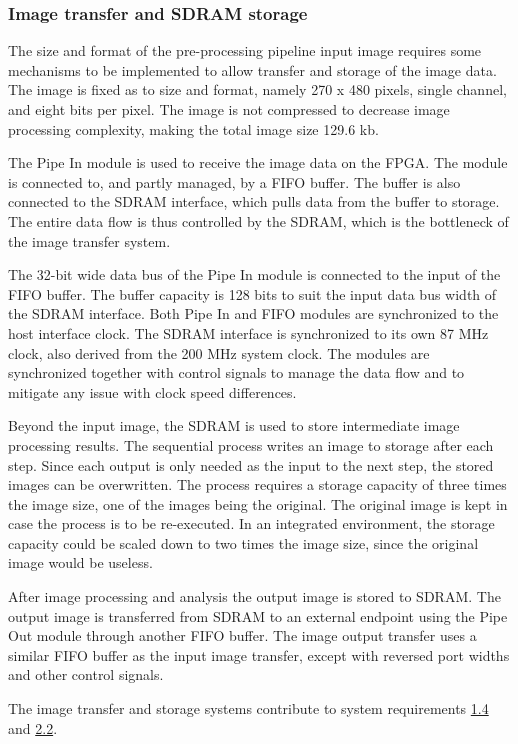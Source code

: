 \documentclass[12pt]{report}
\begin{document}
\subsubsection{Image transfer and SDRAM storage}
The size and format of the pre-processing pipeline input image requires some mechanisms to be implemented to allow transfer and storage of the image data. The image is fixed as to size and format, namely 270 x 480 pixels, single channel, and eight bits per pixel. The image is not compressed to decrease image processing complexity, making the total image size 129.6 kb.
\par
The Pipe In module is used to receive the image data on the FPGA. The module is connected to, and partly managed, by a FIFO buffer. The buffer is also connected to the SDRAM interface, which pulls data from the buffer to storage. The entire data flow is thus controlled by the SDRAM, which is the bottleneck of the image transfer system.
\par
The 32-bit wide data bus of the Pipe In module is connected to the input of the FIFO buffer. The buffer capacity is 128 bits to suit the input data bus width of the SDRAM interface. Both Pipe In and FIFO modules are synchronized to the host interface clock. The SDRAM interface is synchronized to its own 87 MHz clock, also derived from the 200 MHz system clock. The modules are synchronized together with control signals to manage the data flow and to mitigate any issue with clock speed differences.
\par
Beyond the input image, the SDRAM is used to store intermediate image processing results. The sequential process writes an image to storage after each step. Since each output is only needed as the input to the next step, the stored images can be overwritten. The process requires a storage capacity of three times the image size, one of the images being the original. The original image is kept in case the process is to be re-executed. In an integrated environment, the storage capacity could be scaled down to two times the image size, since the original image would be useless. %
\par
After image processing and analysis the output image is stored to SDRAM. The output image is transferred from SDRAM to an external endpoint using the Pipe Out module through another FIFO buffer. The image output transfer uses a similar FIFO buffer as the input image transfer, except with reversed port widths and other control signals.   
\par
The image transfer and storage systems contribute to system requirements \hyperref[req1.4]{1.4} and \hyperref[req2.2]{2.2}.
\end{document}
